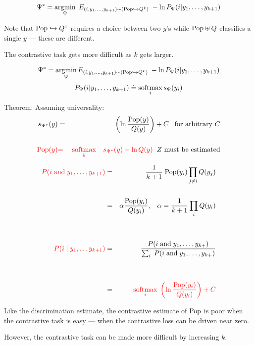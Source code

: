 {

{\color{red} $$\Psi^* = \operatorname*{argmin}_\Psi\; E_{(i,y_1,\ldots,y_{k+1})\sim (\mathrm{Pop}\hookrightarrow Q^k)} \;- \ln P_\Psi(i|y_1,\ldots,y_{k+1})$$}

\vfill
Note that $\mathrm{Pop}\hookrightarrow Q^1$ requires a choice between two $y$'s while $\mathrm{Pop}\uplus Q$ classifies a single $y$ --- these are different.

\vfill
The contrastive task gets more difficult as $k$ gets larger.



$$\Psi^* = \operatorname*{argmin}_\Psi E_{(i,y_1,\ldots,y_{k+1}) \sim (\mathrm{Pop}\hookrightarrow Q^k)} \;- \ln P_\Psi(i|y_1,\ldots,y_{k+1})$$
{\color{red} $$P_\Psi(i|y_1,\ldots,y_{k+1}) \doteq \operatorname*{softmax}_i s_\Psi(y_i)$$}

\vfill
{\color{red} Theorem}: Assuming universality:
\begin{eqnarray*}
s_{\Psi^*}(y) & = & \left(\ln \frac{\mathrm{Pop}(y)}{Q(y)}\right) + C \;\;\;\mbox{for arbitrary $C$}\\
\\
{\color{red} \mathrm{Pop}(y)} & {\color{red} =} & {\color{red} \operatorname*{softmax}_y\;\;\; s_{\Psi^*}(y) - \ln Q(y)}\;\;\mbox{$Z$ must be estimated}
\end{eqnarray*}


{\huge
\begin{eqnarray*}
{\color{red} P(i \;\mathrm{and}\;y_1,\ldots,y_{k+1})} & = & \frac{1}{k+1}\;\mathrm{Pop}(y_i)\prod_{j \not = i}Q(y_j) \\
\\
& = & \alpha \frac{\mathrm{Pop}(y_i)}{Q(y_i)},\;\;\;\alpha = \frac{1}{k+1} \prod_i Q(y_i) \\
\\
\\
{\color{red} P(i\;|\;y_1,\ldots y_{k+1})} & = & \frac{P(i\;\mbox{and} \; y_1,\ldots,y_{k+})}{\sum_i \;P(i \;\mbox{and}\; y_1,\ldots,y_{k+})} \\
\\
\\
& = & {\color{red} \operatorname*{softmax}_i\; \left(\ln \frac{\mathrm{Pop}(y_i)}{Q(y_i)}\right) + C}
\end{eqnarray*}
}


Like the discrimination estimate, the contrastive estimate of $\mathrm{Pop}$ is poor when the contrastive task is easy --- when the contrastive loss can be driven near zero.

\vfill
However, the contrastive task can be made more difficult by increasing $k$.

}

